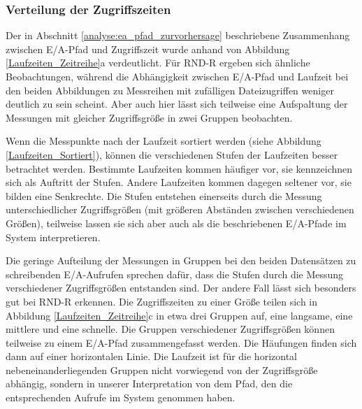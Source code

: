 \documentclass[
	12pt,
	a4paper,
	BCOR10mm,
	DIV14,
	listof=totoc,
	bibliography=totoc,
	headsepline
]{scrreprt}
\begin{document}
\subsubsection{Verteilung der Zugriffszeiten}
Der in Abschnitt \ref{analyse:ea_pfad_zurvorhersage} beschriebene Zusammenhang zwischen E/A-Pfad und Zugriffszeit wurde anhand von Abbildung \ref{Laufzeiten_Zeitreihe}a verdeutlicht.
Für RND-R ergeben sich ähnliche Beobachtungen, während die Abhängigkeit zwischen E/A-Pfad und Laufzeit bei den beiden Abbildungen zu Messreihen mit zufälligen Dateizugriffen weniger deutlich zu sein scheint. Aber auch hier lässt sich teilweise eine Aufspaltung der Messungen mit gleicher Zugriffsgröße in zwei Gruppen beobachten.\medskip

Wenn die Messpunkte nach der Laufzeit sortiert werden (siehe Abbildung \ref{Laufzeiten_Sortiert}), können die verschiedenen Stufen der Laufzeiten besser betrachtet werden.
Bestimmte Laufzeiten kommen häufiger vor, sie kennzeichnen sich als Auftritt der Stufen. Andere Laufzeiten kommen dagegen seltener vor, sie bilden eine Senkrechte.
Die Stufen entstehen einerseits durch die Messung unterschiedlicher Zugriffsgrößen (mit größeren Abständen zwischen verschiedenen Größen), teilweise lassen sie sich aber auch als die beschriebenen E/A-Pfade im System interpretieren.\medskip

Die geringe Aufteilung der Messungen in Gruppen bei den beiden Datensätzen zu schreibenden E/A-Aufrufen sprechen dafür, dass die Stufen durch die Messung verschiedener Zugriffsgrößen entstanden sind.
Der andere Fall lässt sich besonders gut bei RND-R erkennen. Die Zugriffszeiten zu einer Größe teilen sich in Abbildung \ref{Laufzeiten_Zeitreihe}c in etwa drei Gruppen auf, eine langsame, eine mittlere und eine schnelle.
Die Gruppen verschiedener Zugriffsgrößen können teilweise zu einem E/A-Pfad zusammengefasst werden. Die Häufungen finden sich dann auf einer horizontalen Linie. 
Die Laufzeit ist für die horizontal nebeneinanderliegenden Gruppen nicht vorwiegend von der Zugriffsgröße abhängig, sondern in unserer Interpretation von dem Pfad, den die entsprechenden Aufrufe im System genommen haben. 
\end{document}

